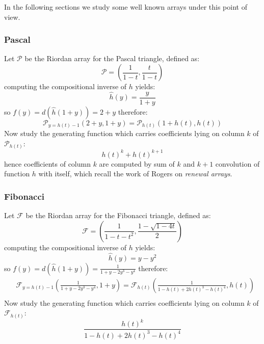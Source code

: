 \documentclass[11pt,a4paper]{article} %
\begin{document}
    In the following sections we study some well known arrays under this point of view.

    \subsubsection{Pascal}
    Let $\mathcal{P}$ be the Riordan array for the Pascal triangle,
    defined as:
    \begin{displaymath} 
        \mathcal{P} = \left(\frac{1}{1-t}, \frac{t}{1-t}  \right)
    \end{displaymath} 
    computing the compositional inverse of $h$ yields:
    \begin{displaymath} 
        \hat{h}(y) = \frac{y}{1+y}
    \end{displaymath} 
    so $f(y)=d(\hat{h}(1+y))=2+y$ therefore:
    \begin{displaymath} 
        \mathcal{P}_{y=h(t)-1}\left( 2+y, 1+y \right)= \mathcal{P}_{h(t)}\left( 1+h(t), h(t) \right)
    \end{displaymath} 
    Now study the generating function which carries coefficients lying on column $k$
    of $\mathcal{P}_{h(t)}$:
    \begin{displaymath} 
        h(t)^k + h(t)^{k+1}
    \end{displaymath} 
    hence coefficients of column $k$ are computed by sum of $k$ and $k+1$ convolution 
    of function $h$ with itself, which recall the work of Rogers on \emph{renewal arrays}.

    \subsubsection{Fibonacci}
    Let $\mathcal{F}$ be the Riordan array for the Fibonacci triangle,
    defined as:
    \begin{displaymath} 
        \mathcal{F} = \left(\frac{1}{1-t-t^2}, \frac{1-\sqrt{1-4t}}{2}  \right)
    \end{displaymath} 
    computing the compositional inverse of $h$ yields:
    \begin{displaymath} 
        \hat{h}(y) = y - y^2
    \end{displaymath} 
    so $f(y)=d(\hat{h}(1+y))=\frac{1}{1+y-2y^3-y^4}$ therefore:
    \begin{displaymath} 
        \begin{split} 
            & \mathcal{F}_{y=h(t)-1}\left( \frac{1}{1+y-2y^3-y^4}, 1+y \right) = \mathcal{F}_{h(t)}\left( \frac{1}{1-h(t)+2h(t)^3-h(t)^4}, h(t) \right)\\
        \end{split} 
    \end{displaymath} 
    Now study the generating function which carries coefficients lying on column $k$
    of $\mathcal{F}_{h(t)}$:
    \begin{displaymath} 
        \frac{h(t)^k}{1-h(t)+2h(t)^3-h(t)^4}
    \end{displaymath} 
\end{document}
